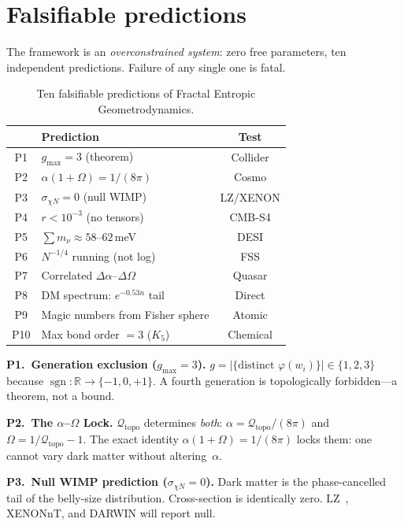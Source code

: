 \documentclass[aps,prd,twocolumn,superscriptaddress,nofootinbib,amsmath,amssymb,longbibliography]{revtex4-2}
\newcommand{\sgn}{\operatorname{sgn}}
\newcommand{\Qtopo}{\mathcal{Q}_{\mathrm{topo}}}
\begin{document}
\section{Falsifiable predictions}\label{sec:predictions}

The framework is an \emph{overconstrained system}: zero free parameters,
ten independent predictions.  Failure of any single one is fatal.

\begin{table}[h]
\caption{Ten falsifiable predictions of Fractal Entropic Geometrodynamics.}
\label{tab:predictions}
\setlength{\tabcolsep}{3pt}
\begin{tabular}{@{}clc@{}}
\toprule
& \textbf{Prediction} & \textbf{Test} \\
\midrule
P1 & $g_{\max} = 3$ (theorem) & Collider \\
P2 & $\alpha(1+\Omega) = 1/(8\pi)$ & Cosmo \\
P3 & $\sigma_{\chi N} = 0$ (null WIMP) & LZ/XENON \\
P4 & $r < 10^{-3}$ (no tensors) & CMB-S4 \\
P5 & $\sum m_\nu \approx 58$--$62$\,meV & DESI \\
P6 & $N^{-1/4}$ running (not log) & FSS \\
P7 & Correlated $\Delta\alpha$--$\Delta\Omega$ & Quasar \\
P8 & DM spectrum: $e^{-0.53n}$ tail & Direct \\
P9 & Magic numbers from Fisher sphere & Atomic \\
P10 & Max bond order $= 3$ ($K_5$) & Chemical \\
\bottomrule
\end{tabular}
\end{table}

\textbf{P1.\ Generation exclusion ($g_{\max} = 3$).}
$g = |\{\text{distinct } \varphi(w_i)\}| \in \{1,2,3\}$ because
$\sgn \colon \mathbb{R} \to \{-1,0,+1\}$.
A fourth generation is topologically forbidden---a theorem, not a bound.

\textbf{P2.\ The $\alpha$--$\Omega$ Lock.}
$\Qtopo$ determines \emph{both}: $\alpha = \Qtopo/(8\pi)$
and $\Omega = 1/\Qtopo - 1$.
The exact identity $\alpha(1 + \Omega) = 1/(8\pi)$ locks them:
one cannot vary dark matter without altering~$\alpha$.

\textbf{P3.\ Null WIMP prediction ($\sigma_{\chi N} = 0$).}
Dark matter is the phase-cancelled tail of the belly-size
distribution.
Cross-section is identically zero.
LZ~\cite{lz2022}, XENONnT, and DARWIN will report null.
\end{document}
